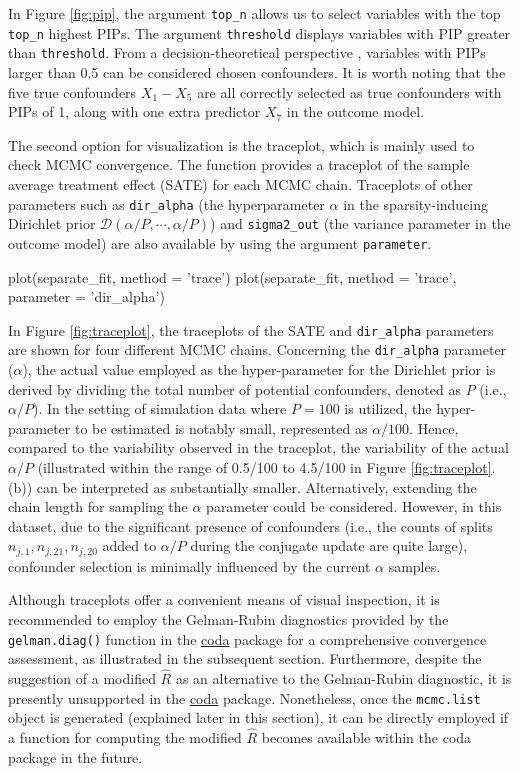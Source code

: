 In Figure \ref{fig:pip}, the argument \verb|top_n| allows us to select variables with the top \verb|top_n| highest PIPs. The argument \verb|threshold| displays variables with PIP greater than \verb|threshold|. From a decision-theoretical perspective \citep{barbieri2004optimal, linero2018bayesian}, variables with PIPs larger than 0.5 can be considered chosen confounders. It is worth noting that the five true confounders $X_1-X_5$ are all correctly selected as true confounders with PIPs of 1, along with one extra predictor $X_7$ in the outcome model.

The second option for visualization is the traceplot, which is mainly used to check MCMC convergence. The function provides a traceplot of the sample average treatment effect (SATE) for each MCMC chain. Traceplots of other parameters such as \verb|dir_alpha| (the hyperparameter $\alpha$ in the sparsity-inducing Dirichlet prior $\mathcal{D}(\alpha/P, \cdots, \alpha/P)$) and \verb|sigma2_out| (the variance parameter in the outcome model) are also available by using the argument \verb|parameter|.

\begin{example}
plot(separate_fit, method = 'trace')
plot(separate_fit, method = 'trace', parameter = 'dir_alpha')
\end{example}

In Figure \ref{fig:traceplot}, the traceplots of the SATE and \verb|dir_alpha| parameters are shown for four different MCMC chains. 
Concerning the \verb|dir_alpha| parameter ($\alpha$), the actual value employed as the hyper-parameter for the Dirichlet prior is derived by dividing the total number of potential confounders, denoted as $P$ (i.e., $\alpha /P$). In the setting of simulation data where $P=100$ is utilized, the hyper-parameter to be estimated is notably small, represented as $\alpha /100$. Hence, compared to the variability observed in the traceplot, the variability of the actual $\alpha /P$ (illustrated within the range of 0.5/100 to 4.5/100 in Figure \ref{fig:traceplot}.(b)) can be interpreted as substantially smaller. Alternatively, extending the chain length for sampling the $\alpha$ parameter could be considered. However, in this dataset, due to the significant presence of confounders (i.e., the counts of splits $n_{j,1}, n_{j,21}, n_{j,20}$ added to $\alpha/P$ during the conjugate update are quite large), confounder selection is minimally influenced by the current $\alpha$ samples.

Although traceplots offer a convenient means of visual inspection, it is recommended to employ the Gelman-Rubin diagnostics provided by the \verb|gelman.diag()| function in the \href{https://cran.r-project.org/package=coda}{coda} package \citep{CODA} for a comprehensive convergence assessment, as illustrated in the subsequent section. Furthermore, despite the suggestion of a modified $\hat{R}$ \citep{vehtari2021} as an alternative to the Gelman-Rubin diagnostic, it is presently unsupported in the \href{https://cran.r-project.org/package=coda}{coda} package. Nonetheless, once the \verb|mcmc.list| object is generated (explained later in this section), it can be directly employed if a function for computing the modified $\hat{R}$ becomes available within the coda package in the future.

